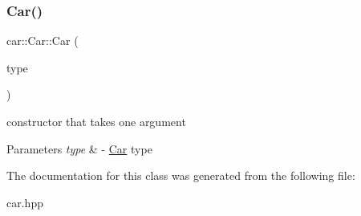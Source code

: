 \subsubsection{\texorpdfstring{Car()}{Car()}}
{\footnotesize\ttfamily car\+::\+Car\+::\+Car (\begin{DoxyParamCaption}\item[{\hyperlink{namespacecar_a5a73671161a4e115408b2d713d3280a6}{Type}}]{type }\end{DoxyParamCaption})\hspace{0.3cm}{\ttfamily [inline]}}



constructor that takes one argument 


\begin{DoxyParams}{Parameters}
{\em type} & -\/ \hyperlink{classcar_1_1_car}{Car} type \\
\hline
\end{DoxyParams}


The documentation for this class was generated from the following file\+:\begin{DoxyCompactItemize}
\item 
car.\+hpp\end{DoxyCompactItemize}
